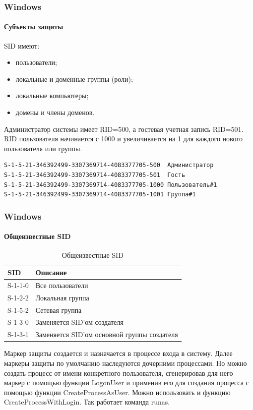 \begin{frame}[fragile]
    \frametitle{Windows}
    \framesubtitle{Субъекты защиты}
    
    SID имеют:
    \begin{itemize}
        \item пользователи;
        \item локальные и доменные группы (роли);
        \item локальные компьютеры;
        \item домены и члены доменов.
    \end{itemize}
    \alert{Администратор} системы имеет RID=500, а гостевая учетная запись RID=501. RID пользователя начинается с 1000 и увеличивается на 1 для каждого нового пользователя или группы.
\begin{verbatim}
S-1-5-21-346392499-3307369714-4083377705-500  Администратор
S-1-5-21-346392499-3307369714-4083377705-501  Гость
S-1-5-21-346392499-3307369714-4083377705-1000 Пользователь#1
S-1-5-21-346392499-3307369714-4083377705-1001 Группа#1
\end{verbatim}
\end{frame}


\begin{frame}
    \frametitle{Windows}
    \framesubtitle{Общеизвестные SID}
    
    \begin{table}[ht]
        \caption{Общеизвестные SID}\label{t:winSid}
        \centering
        \begin{tabular}[c]{l|l}
            \hline\hline
            SID       & Описание   \\
            \hline
            S-1-1-0   & Все пользователи \\ 
            S-1-2-2   & Локальная группа \\ 
            S-1-5-2   & Сетевая группа \\ 
            S-1-3-0   & Заменяется SID'ом создателя \\ 
            S-1-3-1   & Заменяется SID'ом основной группы создателя \\ 
            \hline
        \end{tabular}
    \end{table}
\end{frame}


Маркер защиты создается и назначается в процессе входа в систему. Далее маркеры защиты по умолчанию наследуются дочерними процессами. Но можно создать процесс от имени конкретного пользователя, сгенерировав для него маркер с помощью функции LogonUser и применив его для создания процесса с помощью функции CreateProcessAsUser. Можно использовать и функцию CreateProcessWithLogin. Так работает команда runas.


